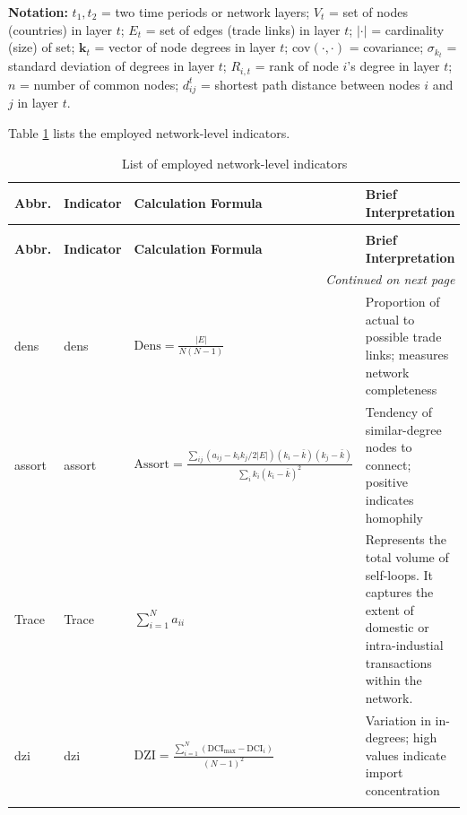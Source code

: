 \documentclass[preprint, 3p,
authoryear]{elsarticle} %
\begin{document}
\textbf{Notation:} \(t_1, t_2\) = two time periods or network layers;
\(V_t\) = set of nodes (countries) in layer \(t\); \(E_t\) = set of
edges (trade links) in layer \(t\); \(|\cdot|\) = cardinality (size) of
set; \(\mathbf{k}_t\) = vector of node degrees in layer \(t\);
\(\text{cov}(\cdot, \cdot)\) = covariance; \(\sigma_{k_t}\) = standard
deviation of degrees in layer \(t\); \(R_{i,t}\) = rank of node \(i\)'s
degree in layer \(t\); \(n\) = number of common nodes; \(d_{ij}^t\) =
shortest path distance between nodes \(i\) and \(j\) in layer \(t\).

Table \ref{tab:networklevelind} lists the employed network-level
indicators.

\begin{longtable}{p{1.2cm}p{3.5cm}p{5.5cm}p{5cm}}
\caption{List of employed network-level indicators}\label{tab:networklevelind} \\
\toprule
\textbf{Abbr.} & \textbf{Indicator} & \textbf{Calculation Formula} & \textbf{Brief Interpretation} \\
\midrule
\endfirsthead
\caption{List of employed network-level indicators} \\
\toprule
\textbf{Abbr.} & \textbf{Indicator} & \textbf{Calculation Formula} & \textbf{Brief Interpretation} \\
\midrule
\endhead
\midrule
\multicolumn{4}{r}{\textit{Continued on next page}} \\
\endfoot
\bottomrule
\endlastfoot

\acrshort{dens} & \acrlong{dens} & $\text{Dens} = \frac{|E|}{N(N-1)}$ & Proportion of actual to possible trade links; measures network completeness \\
\addlinespace

\acrshort{assort} & \acrlong{assort} & $\text{Assort} = \frac{\sum_{ij} (a_{ij} - k_i k_j / 2|E|)(k_i - \bar{k})(k_j - \bar{k})}{\sum_i k_i (k_i - \bar{k})^2}$ & Tendency of similar-degree nodes to connect; positive indicates homophily \\
\addlinespace

Trace & Trace & $\sum_{i=1}^{N}a_{ii}$ & Represents the total volume of self-loops. It captures the extent of domestic or intra-industial transactions within the network. \\
\addlinespace

\acrshort{dzi} & \acrlong{dzi} & $\text{DZI} = \frac{\sum_{i=1}^{N} (\text{DCI}_{\max} - \text{DCI}_i)}{(N-1)^2}$ & Variation in in-degrees; high values indicate import concentration \\
\addlinespace


\end{longtable}
\end{document}
